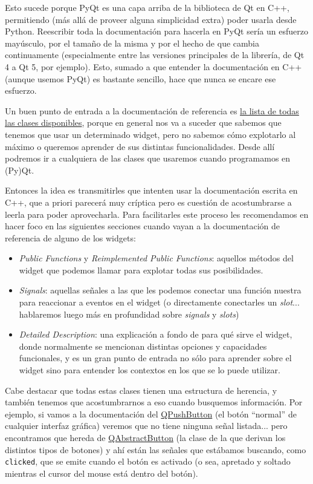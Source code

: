 Esto sucede porque PyQt es una capa arriba de la biblioteca de Qt en C++, permitiendo (más allá de proveer alguna simplicidad extra) poder usarla desde Python. Reescribir toda la documentación para hacerla en PyQt sería un esfuerzo mayúsculo, por el tamaño de la misma y por el hecho de que cambia continuamente (especialmente entre las versiones principales de la librería, de Qt 4 a Qt 5, por ejemplo). Esto, sumado a que entender la documentación en C++ (aunque usemos PyQt) es bastante sencillo, hace que nunca se encare ese esfuerzo.

Un buen punto de entrada a la documentación de referencia es \href{https://doc.qt.io/qt-6/classes.html}{la lista de todas las clases disponibles}, porque en general nos va a suceder que sabemos que tenemos que usar un determinado widget, pero no sabemos cómo explotarlo al máximo o queremos aprender de sus distintas funcionalidades. Desde allí podremos ir a cualquiera de las clases que usaremos cuando programamos en (Py)Qt. 

Entonces la idea es transmitirles que intenten usar la documentación escrita en C++, que a priori parecerá muy críptica pero es cuestión de acostumbrarse a leerla para poder aprovecharla. Para facilitarles este proceso les recomendamos en hacer foco en las siguientes secciones cuando vayan a la documentación de referencia de alguno de los widgets:

\begin{itemize}
\item\textit{Public Functions} y \textit{Reimplemented Public Functions}: aquellos métodos del widget que podemos llamar para explotar todas sus posibilidades.
\item\textit{Signals}: aquellas señales a las que les podemos conectar una función nuestra para reaccionar a eventos en el widget (o directamente conectarles un \textit{slot}... hablaremos luego más en profundidad sobre \textit{signals} y \textit{slots})
\item\textit{Detailed Description}: una explicación a fondo de para qué sirve el widget, donde normalmente se mencionan distintas opciones y capacidades funcionales, y es un gran punto de entrada no sólo para aprender sobre el widget sino para entender los contextos en los que se lo puede utilizar.
\end{itemize}

Cabe destacar que todas estas clases tienen una estructura de herencia, y también tenemos que acostumbrarnos a eso cuando busquemos información. Por ejemplo, si vamos a la documentación del \href{https://doc.qt.io/qt-6/qpushbutton.html}{QPushButton} (el botón ``normal'' de cualquier interfaz gráfica) veremos que no tiene ninguna señal listada... pero encontramos que hereda de \href{https://doc.qt.io/qt-6/qabstractbutton.html}{QAbstractButton} (la clase de la que derivan los distintos tipos de botones) y ahí están las señales que estábamos buscando, como \texttt{clicked}, que se emite cuando el botón es activado (o sea, apretado y soltado mientras el cursor del mouse está dentro del botón).

